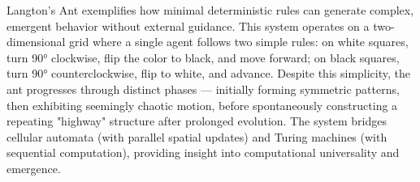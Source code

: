 Langton's Ant exemplifies how minimal deterministic rules can generate complex, emergent behavior without external guidance. This system operates on a two-dimensional grid where a single agent follows two simple rules: on white squares, turn 90° clockwise, flip the color to black, and move forward; on black squares, turn 90° counterclockwise, flip to white, and advance. Despite this simplicity, the ant progresses through distinct phases — initially forming symmetric patterns, then exhibiting seemingly chaotic motion, before spontaneously constructing a repeating "highway" structure after prolonged evolution. The system bridges cellular automata (with parallel spatial updates) and Turing machines (with sequential computation), providing insight into computational universality and emergence.